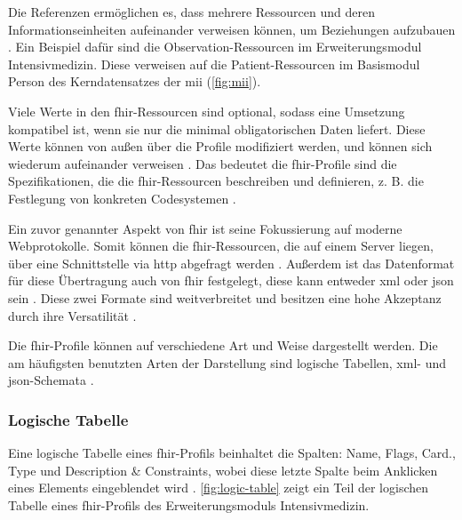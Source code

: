 Die Referenzen ermöglichen es, dass mehrere Ressourcen und deren Informationseinheiten aufeinander verweisen können, um Beziehungen aufzubauen \cite{fhir}. Ein Beispiel dafür sind die \glqq Observation\grqq{}-Ressourcen im Erweiterungsmodul \glqq Intensivmedizin\grqq{}. Diese verweisen auf die \glqq Patient\grqq{}-Ressourcen im Basismodul \glqq Person\grqq{} des Kerndatensatzes der \ac{mii} (\ref{fig:mii}).

Viele Werte in den \ac{fhir}-Ressourcen sind optional, sodass eine Umsetzung kompatibel ist, wenn sie nur die minimal obligatorischen Daten liefert. Diese Werte können von außen über die Profile modifiziert werden, und können sich wiederum aufeinander verweisen \cite{ehealtOk}. Das bedeutet die \ac{fhir}-Profile sind die Spezifikationen, die die \ac{fhir}-Ressourcen beschreiben und definieren, z. B. die Festlegung von konkreten Codesystemen \cite{fhir, fhircompact}.

Ein zuvor genannter Aspekt von \ac{fhir} ist seine Fokussierung auf moderne Webprotokolle. Somit können die \ac{fhir}-Ressourcen, die auf einem Server liegen, über eine Schnittstelle via \ac{http} abgefragt werden \cite{telemedizin, ehealtOk}. Außerdem ist das Datenformat für diese Übertragung auch von \ac{fhir} festgelegt, diese kann entweder \ac{xml} oder \ac{json} sein \cite{ehealtOk}. Diese zwei Formate sind weitverbreitet und besitzen eine hohe Akzeptanz durch ihre Versatilität \cite{fhirformat}.

Die \ac{fhir}-Profile können auf verschiedene Art und Weise dargestellt werden. Die am häufigsten benutzten Arten der Darstellung sind logische Tabellen, \ac{xml}- und \ac{json}-Schemata \cite{fhirformat}.

\subsubsection{Logische Tabelle} \label{subsubsec:logtab}

Eine logische Tabelle eines \ac{fhir}-Profils beinhaltet die Spalten: Name, Flags, Card., Type und Description \& Constraints, wobei diese letzte Spalte beim Anklicken eines Elements eingeblendet wird \cite{fhirformat}. \ref{fig:logic-table} zeigt ein Teil der logischen Tabelle eines \ac{fhir}-Profils des Erweiterungsmoduls \glqq Intensivmedizin\grqq{}.

